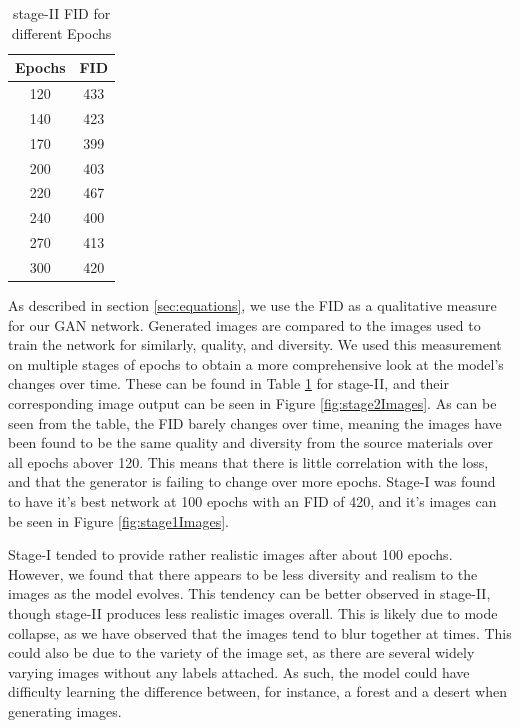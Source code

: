 \documentclass{article}
\begin{document}
	\begin{table}
		\caption{stage-II FID for different Epochs}
		\centering
		\begin{tabular}{|c|c|}
			\hline
			Epochs     & FID \\
			\hline
			120	& 433 \\
			140	& 423 \\
			170	& 399 \\
			200	& 403 \\
			220	& 467 \\
			240	& 400 \\
			270	& 413 \\
			300	& 420	\\
			\hline
		\end{tabular}
		\label{tab:fid}
	\end{table}

	As described in section \ref{sec:equations}, we use the FID as a qualitative measure for our GAN network. Generated images are compared to the images used to train the network for similarly, quality, and diversity. We used this measurement on multiple stages of epochs to obtain a more comprehensive look at the model’s changes over time. These can be found in Table \ref{tab:fid} for stage-II, and their corresponding image output can be seen in Figure \ref{fig:stage2Images}. As can be seen from the table, the FID barely changes over time, meaning the images have been found to be the same quality and diversity from the source materials over all epochs abover 120. This means that there is little correlation with the loss, and that the generator is failing to change over more epochs. Stage-I was found to have it's best network at 100 epochs with an FID of 420, and it's images can be seen in Figure \ref{fig:stage1Images}.

	Stage-I tended to provide rather realistic images after about 100 epochs. However, we found that there appears to be less diversity and realism to the images as the model evolves. This tendency can be better observed in stage-II, though stage-II produces less realistic images overall. This is likely due to mode collapse, as we have observed that the images tend to blur together at times. This could also be due to the variety of the image set, as there are several widely varying images without any labels attached. As such, the model could have difficulty learning the difference between, for instance, a forest and a desert when generating images.
	
\end{document}
